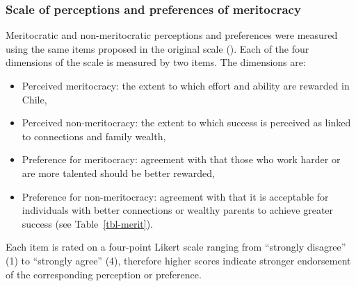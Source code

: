 \documentclass[
  13pt,
]{article}
\begin{document}
\subsubsection{Scale of perceptions and preferences of
meritocracy}\label{scale-of-perceptions-and-preferences-of-meritocracy}

Meritocratic and non-meritocratic perceptions and preferences were
measured using the same items proposed in the original scale
().
Each of the four dimensions of the scale is measured by two items. The
dimensions are:

\begin{itemize}
\item
  Perceived meritocracy: the extent to which effort and ability are
  rewarded in Chile,
\item
  Perceived non-meritocracy: the extent to which success is perceived as
  linked to connections and family wealth,
\item
  Preference for meritocracy: agreement with that those who work harder
  or are more talented should be better rewarded,
\item
  Preference for non-meritocracy: agreement with that it is acceptable
  for individuals with better connections or wealthy parents to achieve
  greater success (see Table~\ref{tbl-merit}).
\end{itemize}

Each item is rated on a four-point Likert scale ranging from ``strongly
disagree'' (1) to ``strongly agree'' (4), therefore higher scores
indicate stronger endorsement of the corresponding perception or
preference.
\end{document}
